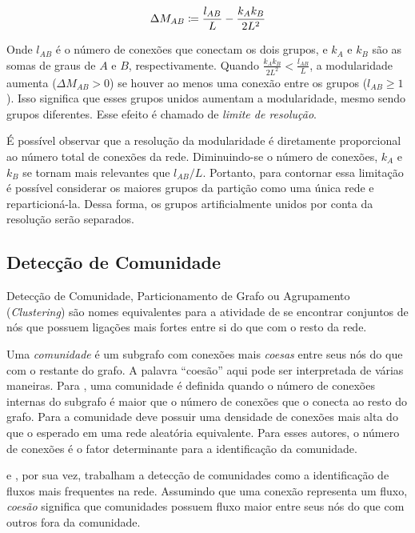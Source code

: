 \documentclass[12pt,a4paper]{article}
\begin{document}
\begin{equation}
\Delta M_{AB} \coloneqq \frac{l_{AB}}{L} - \frac{k_A k_B}{2L^2}
\end{equation}

Onde $l_{AB}$ é o número de conexões que conectam os dois grupos, e $k_A$ e $k_B$ são as somas de graus de $A$ e $B$, respectivamente. Quando $\frac{k_A k_B}{2L^2} < \frac{l_{AB}}{L}$, a modularidade aumenta ($\Delta M_{AB} > 0$) se houver ao menos uma conexão entre os grupos ($l_{AB} \geq 1$). Isso significa que esses grupos unidos aumentam a modularidade, mesmo sendo grupos diferentes. Esse efeito é chamado de \textit{limite de resolução}.

É possível observar que a resolução da modularidade é diretamente proporcional ao número total de conexões da rede. Diminuindo-se o número de conexões, $k_A$ e $k_B$ se tornam mais relevantes que $l_{AB} / L$. Portanto, para contornar essa limitação é possível considerar os maiores grupos da partição como uma única rede e reparticioná-la. Dessa forma, os grupos artificialmente unidos por conta da resolução serão separados.


\subsection{Detecção de Comunidade} \label{sec:deteccao-comunidade}

Detecção de Comunidade, Particionamento de Grafo ou Agrupamento (\textit{Clustering}) são nomes equivalentes para a atividade de se encontrar conjuntos de nós que possuem ligações mais fortes entre si do que com o resto da rede.

Uma \textit{comunidade} é um subgrafo com conexões mais \textit{coesas} entre seus nós do que com o restante do grafo. A palavra \enquote{coesão} aqui pode ser interpretada de várias maneiras. Para , uma comunidade é definida quando o número de conexões internas do subgrafo é maior que o número de conexões que o conecta ao resto do grafo. Para  a comunidade deve possuir uma densidade de conexões mais alta do que o esperado em uma rede aleatória equivalente. Para esses autores, o número de conexões é o fator determinante para a identificação da comunidade.

 e , por sua vez, trabalham a detecção de comunidades como a identificação de fluxos mais frequentes na rede. Assumindo que uma conexão representa um fluxo, \textit{coesão} significa que comunidades possuem fluxo maior entre seus nós do que com outros fora da comunidade.
\end{document}
